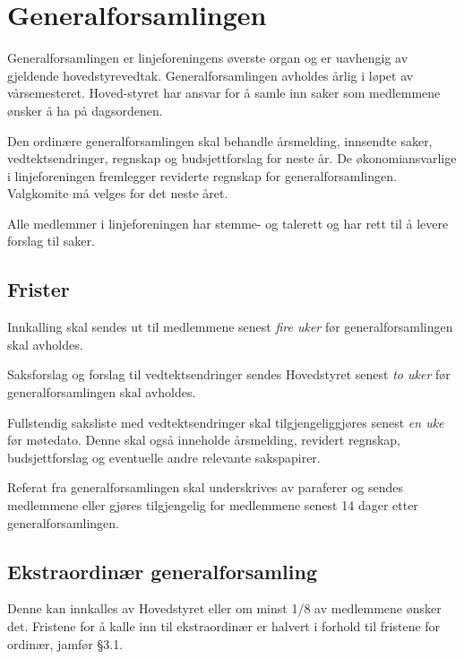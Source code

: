 \chapter{Generalforsamlingen}

Generalforsamlingen er linjeforeningens øverste organ og er uavhengig av gjeldende hovedstyrevedtak. Generalforsamlingen avholdes årlig i løpet av vårsemesteret. Hoved-styret har ansvar for å samle inn saker som medlemmene ønsker å ha på \mbox{dagsordenen}. \newline

Den ordinære generalforsamlingen skal behandle årsmelding, innsendte saker, \linebreak vedtektsendringer, regnskap og budsjettforslag for neste år. De økonomiansvarlige i linjeforeningen fremlegger reviderte regnskap for generalforsamlingen. Valgkomite må velges for det neste året. \newline

Alle medlemmer i linjeforeningen har stemme- og talerett og har rett til å levere forslag til saker.

\section{Frister}
\label{sec:frister}
\begin{liste}
	\item Innkalling skal sendes ut til medlemmene senest \emph{fire uker} før \mbox{generalforsamlingen} skal avholdes.
	\item Saksforslag og forslag til vedtektsendringer sendes Hovedstyret senest \emph{to uker} før generalforsamlingen skal avholdes.
	\item Fullstendig saksliste med vedtektsendringer skal tilgjengeliggjøres senest \emph{en uke} før møtedato. Denne skal også inneholde årsmelding, revidert regnskap, budsjettforslag og eventuelle andre relevante sakspapirer.
	\item Referat fra generalforsamlingen skal underskrives av paraferer og sendes \linebreak medlemmene eller gjøres tilgjengelig for medlemmene senest 14 dager etter generalforsamlingen.
\end{liste}


\section{Ekstraordinær generalforsamling}
Denne kan innkalles av Hovedstyret eller om minst 1/8 av medlemmene ønsker det. Fristene for å kalle inn til ekstraordinær er halvert i forhold til fristene for ordinær, jamfør §3.1. 

